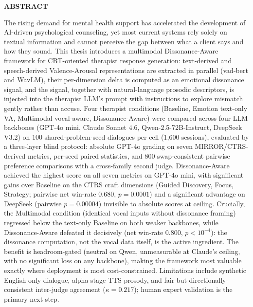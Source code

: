 {}

\begin{center}
    \large{\bf ABSTRACT}
\end{center}

    The rising demand for mental health support has accelerated the development of AI-driven psychological counseling, yet most current systems rely solely on textual information and cannot perceive the gap between what a client says and how they sound. This thesis introduces a multimodal Dissonance-Aware framework for CBT-oriented therapist response generation: text-derived and speech-derived Valence-Arousal representations are extracted in parallel (vad-bert and WavLM), their per-dimension delta is computed as an emotional dissonance signal, and the signal, together with natural-language prosodic descriptors, is injected into the therapist LLM's prompt with instructions to explore mismatch gently rather than accuse. Four therapist conditions (Baseline, Emotion text-only VA, Multimodal vocal-aware, Dissonance-Aware) were compared across four LLM backbones (GPT-4o mini, Claude Sonnet 4.6, Qwen-2.5-72B-Instruct, DeepSeek V3.2) on 100 shared-problem-seed dialogues per cell (1,600 sessions), evaluated by a three-layer blind protocol: absolute GPT-4o grading on seven MIRROR/CTRS-derived metrics, per-seed paired statistics, and 800 swap-consistent pairwise preference comparisons with a cross-family second judge. Dissonance-Aware achieved the highest score on all seven metrics on GPT-4o mini, with significant gains over Baseline on the CTRS craft dimensions (Guided Discovery, Focus, Strategy; pairwise net win-rate 0.680, $p = 0.0001$) and a significant advantage on DeepSeek (pairwise $p = 0.00004$) invisible to absolute scores at ceiling. Crucially, the Multimodal condition (identical vocal inputs without dissonance framing) regressed below the text-only Baseline on both weaker backbones, while Dissonance-Aware defeated it decisively (net win-rate 0.800, $p < 10^{-4}$): the dissonance computation, not the vocal data itself, is the active ingredient. The benefit is headroom-gated (neutral on Qwen, unmeasurable at Claude's ceiling, with no significant loss on any backbone), making the framework most valuable exactly where deployment is most cost-constrained. Limitations include synthetic English-only dialogue, alpha-stage TTS prosody, and fair-but-directionally-consistent inter-judge agreement ($\kappa = 0.217$); human expert validation is the primary next step.

